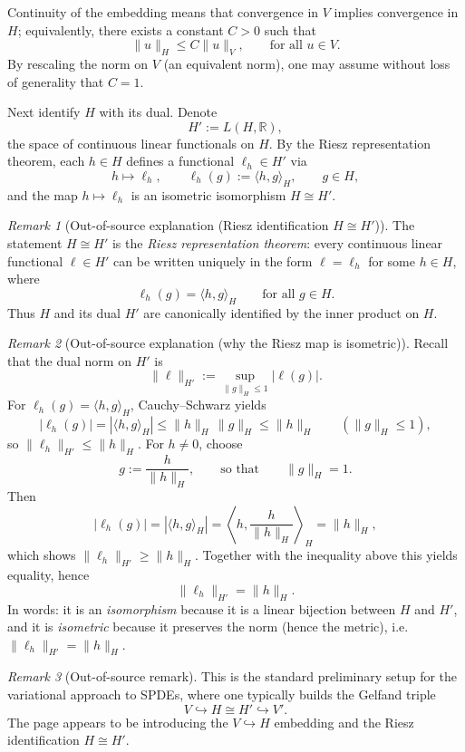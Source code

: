 \documentclass[11pt]{article}
\theoremstyle{definition}
\theoremstyle{remark}
\newtheorem{remark}{Remark}
\begin{document}
Continuity of the embedding means that convergence in $V$ implies convergence in $H$; equivalently, there exists a constant $C>0$ such that
\[
\|u\|_H \le C\|u\|_V,
\qquad \text{for all } u\in V.
\]
By rescaling the norm on $V$ (an equivalent norm), one may assume without loss of generality that $C=1$.

Next identify $H$ with its dual. Denote
\[
H' := L(H,\mathbb{R}),
\]
the space of continuous linear functionals on $H$. By the Riesz representation theorem, each $h\in H$ defines a functional $\ell_h\in H'$ via
\[
h \longmapsto \ell_h,
\qquad
\ell_h(g):=\langle h,g\rangle_H,
\qquad g\in H,
\]
and the map $h\mapsto \ell_h$ is an isometric isomorphism $H\cong H'$.

\begin{remark}[Out-of-source explanation (Riesz identification $H\cong H'$)]
The statement $H\cong H'$ is the \emph{Riesz representation theorem}: every continuous linear functional $\ell\in H'$ can be written uniquely in the form $\ell=\ell_h$ for some $h\in H$, where
\[
\ell_h(g)=\langle h,g\rangle_H \qquad \text{for all } g\in H.
\]
Thus $H$ and its dual $H'$ are canonically identified by the inner product on $H$.
\end{remark}

\begin{remark}[Out-of-source explanation (why the Riesz map is isometric)]
Recall that the dual norm on $H'$ is
\[
\|\ell\|_{H'}:=\sup_{\|g\|_H\le 1} |\ell(g)|.
\]
For $\ell_h(g)=\langle h,g\rangle_H$, Cauchy--Schwarz yields
\[
|\ell_h(g)| = |\langle h,g\rangle_H|
\le \|h\|_H\,\|g\|_H
\le \|h\|_H
\qquad (\|g\|_H\le 1),
\]
so $\|\ell_h\|_{H'}\le \|h\|_H$. For $h\neq 0$, choose
\[
g:=\frac{h}{\|h\|_H},
\qquad\text{so that}\qquad
\|g\|_H=1.
\]
Then
\[
|\ell_h(g)|
=|\langle h,g\rangle_H|
=\left\langle h,\frac{h}{\|h\|_H}\right\rangle_H
=\|h\|_H,
\]
which shows $\|\ell_h\|_{H'}\ge \|h\|_H$. Together with the inequality above this yields equality, hence
\[
\|\ell_h\|_{H'}=\|h\|_H.
\]
In words: it is an \emph{isomorphism} because it is a linear bijection between $H$ and $H'$, and it is \emph{isometric} because it preserves the norm (hence the metric), i.e.\ $\|\ell_h\|_{H'}=\|h\|_H$.
\end{remark}

\begin{remark}[Out-of-source remark]
This is the standard preliminary setup for the variational approach to SPDEs, where one typically builds the Gelfand triple
\[
V \hookrightarrow H \cong H' \hookrightarrow V'.
\]
The page appears to be introducing the $V\hookrightarrow H$ embedding and the Riesz identification $H\cong H'$.
\end{remark}
\end{document}
